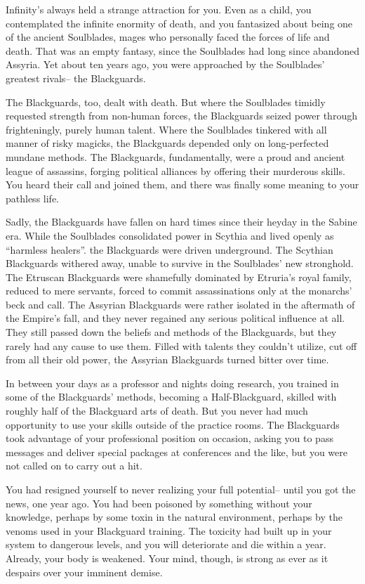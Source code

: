 \documentclass[char]{Kos}
\begin{document}
Infinity's always held a strange attraction for you. Even as a child, you contemplated the infinite enormity of death, and you fantasized about being one of the ancient Soulblades, mages who personally faced the forces of life and death. That was an empty fantasy, since the Soulblades had long since abandoned Assyria. Yet about ten years ago, you were approached by the Soulblades' greatest rivals-- the Blackguards.

The Blackguards, too, dealt with death. But where the Soulblades timidly requested strength from non-human forces, the Blackguards seized power through frighteningly, purely human talent.  Where the Soulblades tinkered with all manner of risky magicks, the Blackguards depended only on long-perfected mundane methods. The Blackguards, fundamentally, were a proud and ancient league of assassins, forging political alliances by offering their murderous skills. You heard their call and joined them, and there was finally some meaning to your pathless life.

Sadly, the Blackguards have fallen on hard times since their heyday in the Sabine era. While the Soulblades consolidated power in Scythia and lived openly as ``harmless healers''. the Blackguards were driven underground. The Scythian Blackguards withered away, unable to survive in the Soulblades' new stronghold. The Etruscan Blackguards were shamefully dominated by Etruria's royal family, reduced to mere servants, forced to commit assassinations only at the monarchs' beck and call. The Assyrian Blackguards were rather isolated in the aftermath of the Empire's fall, and they never regained any serious political influence at all. They still passed down the beliefs and methods of the Blackguards, but they rarely had any cause to use them. Filled with talents they couldn't utilize, cut off from all their old power, the Assyrian Blackguards turned bitter over time.

In between your days as a professor and nights doing research, you trained in some of the Blackguards' methods, becoming a Half-Blackguard, skilled with roughly half of the Blackguard arts of death. But you never had much opportunity to use your skills outside of the practice rooms. The Blackguards took advantage of your professional position on occasion, asking you to pass messages and deliver special packages at conferences and the like, but you were not called on to carry out a hit.

You had resigned yourself to never realizing your full potential-- until you got the news, one year ago. You had been poisoned by something without your knowledge, perhaps by some toxin in the natural environment, perhaps by the venoms used in your Blackguard training. The toxicity had built up in your system to dangerous levels, and you will deteriorate and die within a year. Already, your body is weakened. Your mind, though, is strong as ever as it despairs over your imminent demise.
\end{document}
